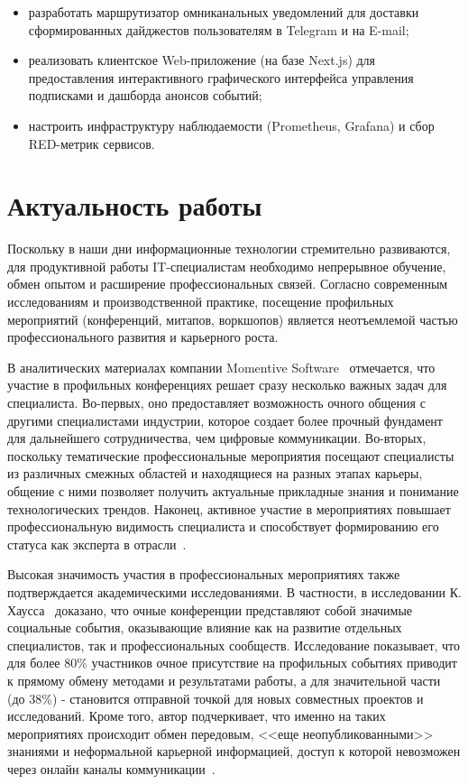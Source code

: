 \begin{itemize}
\begin{itemize}
    \item разработать маршрутизатор омниканальных уведомлений для доставки сформированных дайджестов пользователям в Telegram и на E-mail;
    
    \item реализовать клиентское Web-приложение (на базе Next.js) для предоставления интерактивного графического интерфейса управления подписками и дашборда анонсов событий;
    
    \item настроить инфраструктуру наблюдаемости (Prometheus, Grafana) и сбор RED-метрик сервисов. 
    
\end{itemize}

\end{itemize}


\section*{Актуальность работы}

Поскольку в наши дни информационные технологии стремительно развиваются, для продуктивной работы IT-специалистам необходимо непрерывное обучение, обмен опытом и расширение профессиональных связей. 
Согласно современным исследованиям и производственной практике, посещение профильных мероприятий (конференций, митапов, воркшопов) является неотъемлемой частью профессионального развития и карьерного роста.

В аналитических материалах компании Momentive Software~\cite{attending_conferences_benefits} отмечается, что участие в профильных конференциях решает сразу несколько важных задач для специалиста. 
Во-первых, оно предоставляет возможность очного общения с другими специалистами индустрии, которое создает более прочный фундамент для дальнейшего сотрудничества, чем цифровые коммуникации. 
Во-вторых, поскольку тематические профессиональные мероприятия посещают специалисты из различных смежных областей и находящиеся на разных этапах карьеры, общение с ними позволяет получить актуальные прикладные знания и понимание технологических трендов. 
Наконец, активное участие в мероприятиях повышает профессиональную видимость специалиста и способствует формированию его статуса как эксперта в отрасли~\cite{attending_conferences_benefits}.

Высокая значимость участия в профессиональных мероприятиях также подтверждается академическими исследованиями. 
В частности, в исследовании К. Хаусса~\cite{hauss2020} доказано, что очные конференции представляют собой значимые социальные события, оказывающие влияние как на развитие отдельных специалистов, так и профессиональных сообществ.
Исследование показывает, что для более 80\% участников очное присутствие на профильных событиях приводит к прямому обмену методами и результатами работы, а для значительной части (до 38\%) - становится отправной точкой для новых совместных проектов и исследований. 
Кроме того, автор подчеркивает, что именно на таких мероприятиях происходит обмен передовым, <<еще неопубликованными>> знаниями и неформальной карьерной информацией, доступ к которой невозможен через онлайн каналы коммуникации~\cite{hauss2020}.

